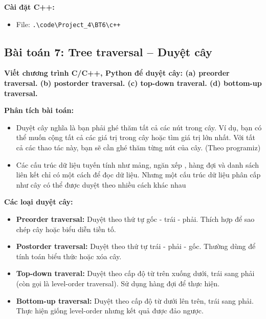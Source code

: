 \documentclass[12pt,a4paper]{article}
\begin{document}
\textbf{Cài đặt C++:}
\begin{itemize}[label=\textbullet]
    \item File: \texttt{.\textbackslash code\textbackslash Project\_4\textbackslash BT6\textbackslash c++}
\end{itemize}

\subsection{Bài toán 7: Tree traversal – Duyệt cây}

\begin{problembox}
    \textbf{Viết chương trình C/C++, Python để duyệt cây: (a) preorder traversal. (b) postorder
traversal. (c) top-down traveral. (d) bottom-up traversal.} 
\end{problembox}

\textbf{Phân tích bài toán:}

\begin{itemize}[label=\textbullet]
    \item Duyệt cây nghĩa là bạn phải ghé thăm tất cả các nút trong cây. Ví dụ, bạn có thể muốn cộng tất cả các giá trị trong cây hoặc tìm giá trị lớn nhất. Với tất cả các thao tác này, bạn sẽ cần ghé thăm từng nút của cây. (Theo programiz)
    \item Các cấu trúc dữ liệu tuyến tính như mảng, ngăn xếp , hàng đợi và danh sách liên kết chỉ có một cách để đọc dữ liệu. Nhưng một cấu trúc dữ liệu phân cấp như cây có thể được duyệt theo nhiều cách khác nhau

\end{itemize}

\textbf{Các loại duyệt cây:}

\begin{itemize}[label=\textbullet]
    \item \textbf{Preorder traversal:} Duyệt theo thứ tự gốc - trái - phải. Thích hợp để sao chép cây hoặc biểu diễn tiền tố.
    \item \textbf{Postorder traversal:} Duyệt theo thứ tự trái - phải - gốc. Thường dùng để tính toán biểu thức hoặc xóa cây.
    \item \textbf{Top-down traveral:} Duyệt theo cấp độ từ trên xuống dưới, trái sang phải (còn gọi là level-order traversal). Sử dụng hàng đợi để thực hiện.
    \item \textbf{Bottom-up traversal:} Duyệt theo cấp độ từ dưới lên trên, trái sang phải. Thực hiện giống level-order nhưng kết quả được đảo ngược.
\end{itemize}
\end{document}
